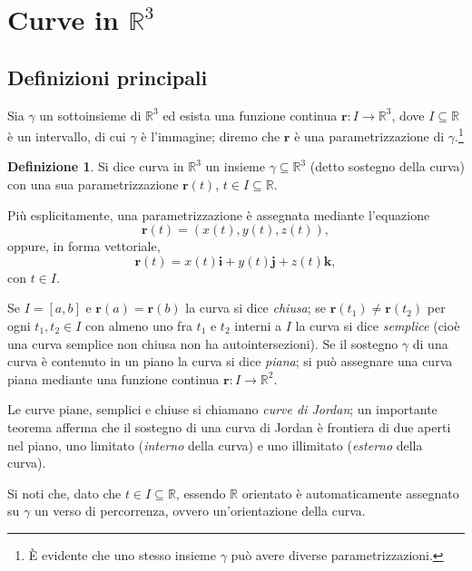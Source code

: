 \documentclass[a4paper]{book}
\numberwithin{equation}{section}
\theoremstyle{plain}
\theoremstyle{definition}
\newtheorem{defn}{Definizione}[section]
\theoremstyle{remark}
\renewcommand{\vec}{\boldsymbol}
\theoremstyle{example}
\begin{document}
\section{Curve in $\mathbb{R}^3$}
\subsection{Definizioni principali}
Sia $\gamma$ un sottoinsieme di $\mathbb{R}^3$ ed esista una funzione continua $\vec{r}\colon \!I \to \mathbb{R}^3$, dove $I \subseteq \mathbb{R}$ è un intervallo, di cui $\gamma$ è l'immagine; diremo che $\vec{r}$ è una parametrizzazione di $\gamma$.\footnote{È evidente che uno stesso insieme $\gamma$ può avere diverse parametrizzazioni.}

\begin{defn}
	Si dice curva in $\mathbb{R}^3$ un insieme $\gamma \subseteq \mathbb{R}^3$ (detto sostegno della curva) con una sua parametrizzazione $\vec{r}(t)$, $t \in I \subseteq \mathbb{R}$.
\end{defn}

Più esplicitamente, una parametrizzazione è assegnata mediante l'equazione
\begin{equation*}
	\vec{r}(t) = (x(t), y(t), z(t)),
\end{equation*}
oppure, in forma vettoriale,
\begin{equation*}
	\vec{r}(t) = x(t)\vec{i} + y(t)\vec{j} + z(t)\vec{k},
\end{equation*}
con $t \in I$.

Se $I = [a, b]$ e $\vec{r}(a) = \vec{r}(b)$ la curva si dice \emph{chiusa}; se $\vec{r}(t_1) \ne \vec{r}(t_2)$ per ogni $t_1, t_2 \in I$ con almeno uno fra $t_1$ e $t_2$ interni a $I$ la curva si dice \emph{semplice} (cioè una curva semplice non chiusa non ha autointersezioni). Se il sostegno $\gamma$ di una curva è contenuto in un piano la curva si dice \emph{piana}; si può assegnare una curva piana mediante una funzione continua $\vec{r} \colon \! I \to \mathbb{R}^2$.

Le curve piane, semplici e chiuse si chiamano \emph{curve di Jordan}; un importante teorema afferma che il sostegno di una curva di Jordan è frontiera di due aperti nel piano, uno limitato (\emph{interno} della curva) e uno illimitato (\emph{esterno} della curva).

Si noti che, dato che $t \in I \subseteq \mathbb{R}$, essendo $\mathbb{R}$ orientato è automaticamente assegnato su $\gamma$ un verso di percorrenza, ovvero un'orientazione della curva.
\end{document}
